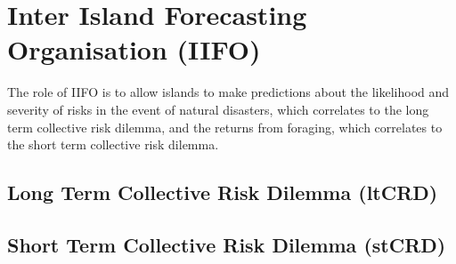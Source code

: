\chapter{Inter Island Forecasting Organisation (IIFO)}

The role of IIFO is to allow islands to make predictions about the likelihood and severity of risks in the event of natural disasters, which correlates to the long term collective risk dilemma, and the returns from foraging, which correlates to the short term collective risk dilemma.

\section{Long Term Collective Risk Dilemma (ltCRD)}
\label{sec:IIFO:ltCRD}


\section{Short Term Collective Risk Dilemma (stCRD)}
\label{sec:IIFO:stCRD}

